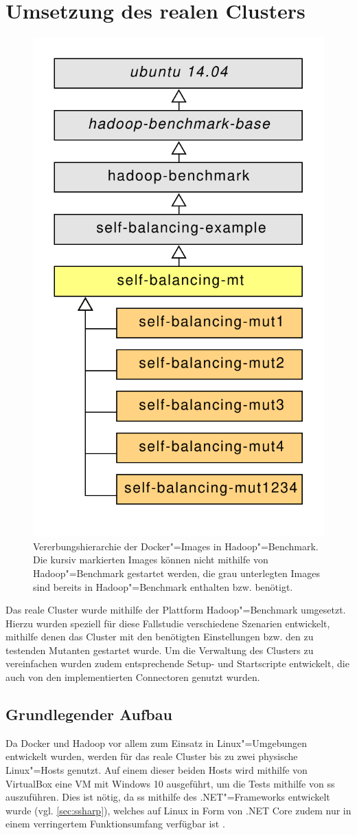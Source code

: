 \section{Umsetzung des realen Clusters}
\label{sec:realCluster}

\begin{figure}
    \includegraphics[width=0.4\columnwidth]
    {./resources/hadoopBenchDockerInherits.pdf}
    \caption[Vererbungshierarchie der Docker"=Images in Hadoop"=Benchmark]
    {Vererbungshierarchie der Docker"=Images in Hadoop"=Benchmark.
    Die kursiv markierten Images können nicht mithilfe von Hadoop"=Benchmark gestartet werden, die grau unterlegten Images sind bereits in Hadoop"=Benchmark enthalten bzw. benötigt.}
    \label{fig:hadoopBenchDockerInherits}
\end{figure}

Das reale Cluster wurde mithilfe der Plattform Hadoop"=Benchmark umgesetzt.
Hierzu wurden speziell für diese Fallstudie verschiedene Szenarien entwickelt, mithilfe denen das Cluster mit den benötigten Einstellungen bzw. den zu testenden Mutanten gestartet wurde.
Um die Verwaltung des Clusters zu vereinfachen wurden zudem entsprechende Setup- und Startscripte entwickelt, die auch von den implementierten Connectoren genutzt wurden.

\subsection{Grundlegender Aufbau}
\label{subsec:clusterBasics}

Da Docker und Hadoop vor allem zum Einsatz in Linux"=Umgebungen entwickelt wurden, werden für das reale Cluster bis zu zwei physische Linux"=Hosts genutzt.
Auf einem dieser beiden Hosts wird mithilfe von VirtualBox eine VM mit Windows 10 ausgeführt, um die Tests mithilfe von \gls{ss} auszuführen.
Dies ist nötig, da \gls{ss} mithilfe des .NET"=Frameworks entwickelt wurde (vgl. \cref{sec:ssharp}), welches auf Linux in Form von .NET Core zudem nur in einem verringertem Funktionsumfang verfügbar ist \cite{Schwichtenberg2017}.

